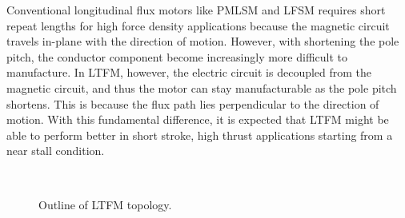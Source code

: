        
        Conventional longitudinal flux motors like \acs{PMLSM} and \acs{LFSM} requires short repeat lengths for high force density applications because the magnetic circuit travels in-plane with the direction of motion. However, with shortening the pole pitch, the conductor component become increasingly more difficult to manufacture. In \acf{LTFM}, however, the electric circuit is decoupled from the magnetic circuit, and thus the motor can stay manufacturable as the pole pitch shortens. This is because the flux path lies perpendicular to the direction of motion. With this fundamental difference, it is expected that \acs{LTFM} might be able to perform better in short stroke, high thrust applications starting from a near stall condition. 
        
        
        \begin{figure}[!ht]
            \centering
            \\
            \caption{Outline of LTFM topology.}
            \label{fig:chapter/rsm/LTFM/different LTFM arrangement}
        \end{figure}


